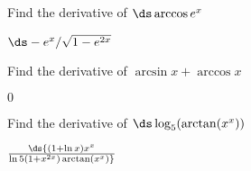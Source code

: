 \begin{exercises}
\begin{exercise} Find the derivative of $\ds \arccos e^x$
\begin{answer} $\ds-e^x/\sqrt{1-e^{2x}}$
\end{answer}\end{exercise}

\begin{exercise} Find the derivative of $\arcsin x + \arccos x$
\begin{answer} $0$
\end{answer}\end{exercise}

\begin{exercise} Find the derivative of $\ds \log _5 (\arctan (x^x ) )$
\begin{answer} $\ds {(1+\ln x)x^x\over\ln5(1+x^{2x})\arctan(x^x)}$
\end{answer}\end{exercise}

\end{exercises}


















